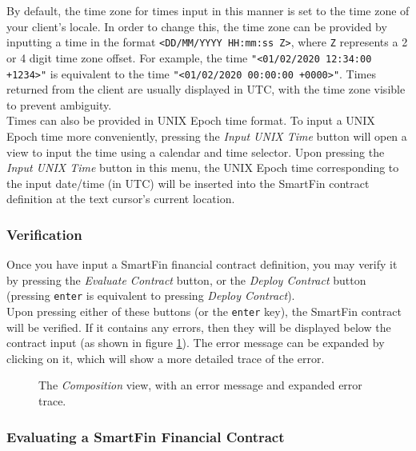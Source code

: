 \documentclass{article}
\begin{document}
By default, the time zone for times input in this manner is set to the time zone of your client's locale. In order to change this, the time zone can be provided by inputting a time in the format \texttt{<DD/MM/YYYY HH:mm:ss Z>}, where \texttt{Z} represents a 2 or 4 digit time zone offset. For example, the time \texttt{"<01/02/2020 12:34:00 +1234>"} is equivalent to the time \texttt{"<01/02/2020 00:00:00 +0000>"}. Times returned from the client are usually displayed in UTC, with the time zone visible to prevent ambiguity. \\

Times can also be provided in UNIX Epoch time format. To input a UNIX Epoch time more conveniently, pressing the \textit{Input UNIX Time} button will open a view to input the time using a calendar and time selector. Upon pressing the \textit{Input UNIX Time} button in this menu, the UNIX Epoch time corresponding to the input date/time (in UTC) will be inserted into the SmartFin contract definition at the text cursor's current location.

\subsubsection{Verification}

Once you have input a SmartFin financial contract definition, you may verify it by pressing the \textit{Evaluate Contract} button, or the \textit{Deploy Contract} button (pressing \texttt{enter} is equivalent to pressing \textit{Deploy Contract}). \\

Upon pressing either of these buttons (or the \texttt{enter} key), the SmartFin contract will be verified. If it contains any errors, then they will be displayed below the contract input (as shown in figure \ref{UG:fig:composition-error}). The error message can be expanded by clicking on it, which will show a more detailed trace of the error.

\begin{figure}[h]
    \centering
    \caption{The \textit{Composition} view, with an error message and expanded error trace.}
    \label{UG:fig:composition-error}
\end{figure}


\subsubsection{Evaluating a SmartFin Financial Contract}
\end{document}
